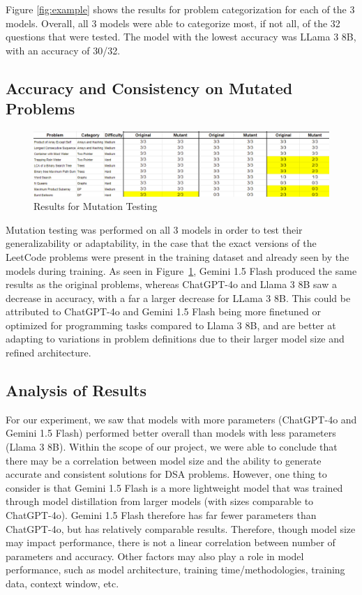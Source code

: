 \documentclass[times, 10pt,twocolumn]{article}
\begin{document}
Figure \ref{fig:example} shows the results for problem categorization for each of the 3 models. Overall, all 3 models were able to categorize most, if not all, of the 32 questions that were tested. The model with the lowest accuracy was LLama 3 8B, with an accuracy of 30/32. 

\subsection{Accuracy and Consistency on Mutated Problems}

\begin{figure}[h]
    \centering
    \includegraphics[width=0.45
    \textwidth]{imgs/mutant-testing.png} %
    \caption{Results for Mutation Testing}
    \label{fig:mutation} %
\end{figure}

Mutation testing was performed on all 3 models in order to test their generalizability or adaptability, in the case that the exact versions of the LeetCode problems were present in the training dataset and already seen by the models during training. As seen in Figure~\ref{fig:mutation}, Gemini 1.5 Flash produced the same results as the original problems, whereas ChatGPT-4o and Llama 3 8B saw a decrease in accuracy, with a far a larger decrease for LLama 3 8B. This could be attributed to ChatGPT-4o and Gemini 1.5 Flash being more finetuned or optimized for programming tasks compared to Llama 3 8B, and are better at adapting to variations in problem definitions due to their larger model size and refined architecture. 


\subsection{Analysis of Results}
For our experiment, we saw that models with more parameters (ChatGPT-4o and Gemini 1.5 Flash) performed better overall than models with less parameters (Llama 3 8B). Within the scope of our project, we were able to conclude that there may be a correlation between model size and the ability to generate accurate and consistent solutions for DSA problems. However, one thing to consider is that Gemini 1.5 Flash is a more lightweight model that was trained through model distillation from larger models (with sizes comparable to ChatGPT-4o). Gemini 1.5 Flash therefore has far fewer parameters than ChatGPT-4o, but has relatively comparable results. Therefore, though model size may impact performance, there is not a linear correlation between number of parameters and accuracy. Other factors may also play a role in model performance, such as model architecture, training time/methodologies, training data, context window, etc. 
\end{document}
